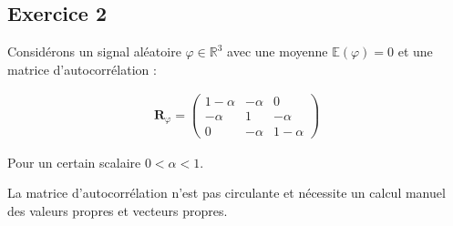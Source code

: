 \documentclass[12pt]{article}
\begin{document}
\subsection{Exercice 2}

Considérons un signal aléatoire \( \varphi \in \mathbb{R}^3 \) avec une moyenne \( \mathbb{E}(\varphi) = 0 \) et une matrice d'autocorrélation :

\begin{align}
\mathbf{R}_\varphi = \begin{pmatrix} 1-\alpha & -\alpha & 0 \\ -\alpha & 1 & -\alpha \\ 0 & -\alpha & 1-\alpha \end{pmatrix}
\end{align}

Pour un certain scalaire \( 0 < \alpha < 1 \).

\begin{tcolorbox}[title={À retenir}]
La matrice d'autocorrélation n'est pas circulante et nécessite un calcul manuel des valeurs propres et vecteurs propres.
\end{tcolorbox}
\end{document}
